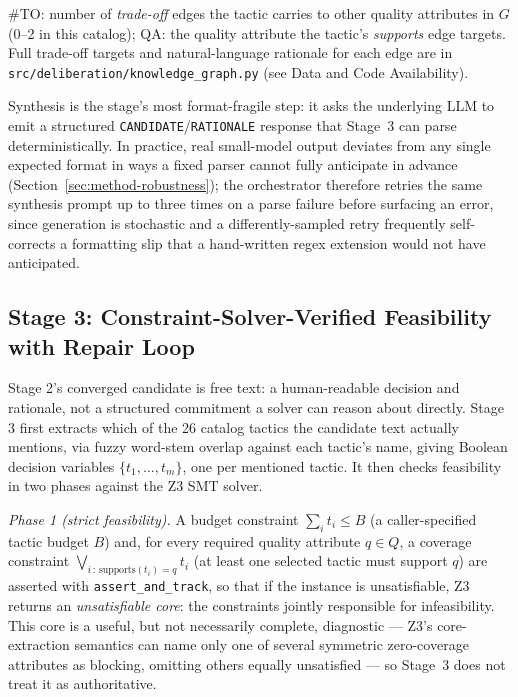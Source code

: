 \documentclass[lettersize,journal]{IEEEtran}
\begin{document}
\begin{table}[t]
\vspace{2pt}
\footnotesize \#TO: number of \emph{trade-off} edges the tactic carries to other quality attributes in $G$ (0--2 in this catalog); QA: the quality attribute the tactic's \emph{supports} edge targets. Full trade-off targets and natural-language rationale for each edge are in \texttt{src/deliberation/knowledge\_graph.py} (see Data and Code Availability).
\end{table}

Synthesis is the stage's most format-fragile step: it asks the underlying LLM to emit a structured \texttt{CANDIDATE}/\texttt{RATIONALE} response that Stage~3 can parse deterministically. In practice, real small-model output deviates from any single expected format in ways a fixed parser cannot fully anticipate in advance (Section~\ref{sec:method-robustness}); the orchestrator therefore retries the same synthesis prompt up to three times on a parse failure before surfacing an error, since generation is stochastic and a differently-sampled retry frequently self-corrects a formatting slip that a hand-written regex extension would not have anticipated.

\subsection{Stage 3: Constraint-Solver-Verified Feasibility with Repair Loop}
\label{sec:method-stage3}

Stage 2's converged candidate is free text: a human-readable decision and rationale, not a structured commitment a solver can reason about directly. Stage 3 first extracts which of the 26 catalog tactics the candidate text actually mentions, via fuzzy word-stem overlap against each tactic's name, giving Boolean decision variables $\{t_1, \ldots, t_m\}$, one per mentioned tactic. It then checks feasibility in two phases against the Z3 SMT solver.

\emph{Phase 1 (strict feasibility).} A budget constraint $\sum_i t_i \leq B$ (a caller-specified tactic budget $B$) and, for every required quality attribute $q \in Q$, a coverage constraint $\bigvee_{i \,:\, \mathrm{supports}(t_i) = q} t_i$ (at least one selected tactic must support $q$) are asserted with \texttt{assert\_and\_track}, so that if the instance is unsatisfiable, Z3 returns an \emph{unsatisfiable core}: the constraints jointly responsible for infeasibility. This core is a useful, but not necessarily complete, diagnostic --- Z3's core-extraction semantics can name only one of several symmetric zero-coverage attributes as blocking, omitting others equally unsatisfied --- so Stage~3 does not treat it as authoritative.
\end{document}
